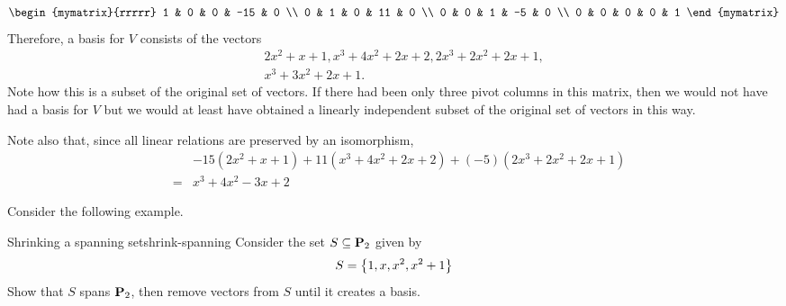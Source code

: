 \begin{solution}
\begin{equation*}
    \begin{mymatrix}{rrrrr}
      1 & 0 & 0 & -15 & 0 \\
      0 & 1 & 0 & 11 & 0 \\
      0 & 0 & 1 & -5 & 0 \\
      0 & 0 & 0 & 0 & 1
    \end{mymatrix}
  \end{equation*}
  Therefore, a basis for $V$ consists of the vectors
  \begin{eqnarray*}
    &&2x^{2}+x+1,x^{3}+4x^{2}+2x+2,2x^{3}+2x^{2}+2x+1, \\
    &&x^{3}+3x^{2}+2x+1.
  \end{eqnarray*}
  Note how this is a subset of the original set of vectors. If there
  had been only three pivot columns in this matrix, then we would not
  have had a basis for $V$ but we would at least have obtained a
  linearly independent subset of the original set of vectors in this
  way.

  Note also that, since all linear relations are preserved by an
  isomorphism,
  \begin{eqnarray*}
    &&-15(2x^{2}+x+1) +11(x^{3}+4x^{2}+2x+2) +(
       -5) (2x^{3}+2x^{2}+2x+1) \\
    &=&x^{3}+4x^{2}-3x+2
  \end{eqnarray*}

\end{solution}

Consider the following example.

\begin{example}{Shrinking a spanning set}{shrink-spanning}
  Consider the set $S \subseteq \mathbf{P}_2$ given by
  \begin{equation*}
    S = \left\{1, x, x^2, x^2 + 1 \right\}
  \end{equation*}
  Show that $S$ spans $\mathbf{P}_2$, then remove vectors from $S$ until it
  creates a basis.
\end{example}

